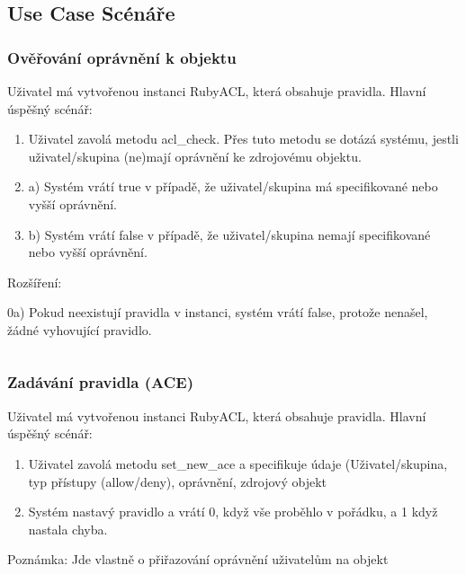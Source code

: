 \documentclass[11pt,twoside,a4paper]{book}
\begin{document}
\subsection{Use Case Scénáře}
\subsubsection{Ověřování oprávnění k objektu}
Uživatel má vytvořenou instanci RubyACL, která obsahuje pravidla.
Hlavní úspěšný scénář:
\begin{enumerate}
\item Uživatel zavolá metodu acl\_check. Přes tuto metodu se dotázá systému, jestli uživatel/skupina (ne)mají oprávnění ke zdrojovému objektu.
\item a) Systém vrátí true v případě, že uživatel/skupina má specifikované nebo vyšší oprávnění.
\item b) Systém vrátí false v případě, že uživatel/skupina nemají specifikované nebo vyšší oprávnění.
\end{enumerate}
Rozšíření:

0a) Pokud neexistují pravidla v instanci, systém vrátí false, protože nenašel, žádné vyhovující pravidlo.
\begin{verbatim}\end{verbatim}

\subsubsection{Zadávání pravidla (ACE)}
Uživatel má vytvořenou instanci RubyACL, která obsahuje pravidla.
Hlavní úspěšný scénář:
\begin{enumerate}
\item Uživatel zavolá metodu set\_new\_ace a specifikuje údaje (Uživatel/skupina, typ přístupy (allow/deny), oprávnění, zdrojový objekt
\item Systém nastavý pravidlo a vrátí 0, když vše proběhlo v pořádku, a 1 když nastala chyba.
\end{enumerate}
Poznámka: Jde vlastně o přiřazování oprávnění uživatelům na objekt



\end{document}
